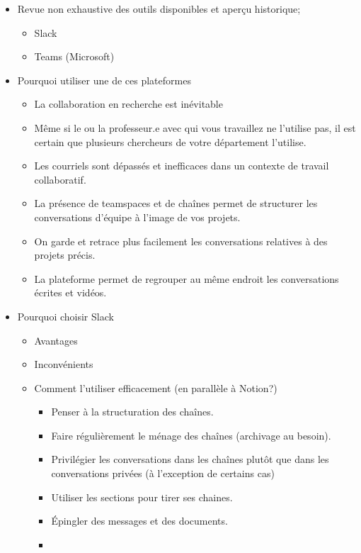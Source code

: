 \documentclass[
  letterpaper,
]{scrbook}
\providecommand{\tightlist}{%
  \setlength{\itemsep}{0pt}\setlength{\parskip}{0pt}}\usepackage{longtable,booktabs,array}
\begin{document}
\begin{itemize}
\tightlist
\item
  Revue non exhaustive des outils disponibles et aperçu historique;

  \begin{itemize}
  \item
    Slack
  \item
    Teams (Microsoft)
  \end{itemize}
\item
  Pourquoi utiliser une de ces plateformes

  \begin{itemize}
  \item
    La collaboration en recherche est inévitable
  \item
    Même si le ou la professeur.e avec qui vous travaillez ne l'utilise
    pas, il est certain que plusieurs chercheurs de votre département
    l'utilise.
  \item
    Les courriels sont dépassés et inefficaces dans un contexte de
    travail collaboratif.
  \item
    La présence de teamspaces et de chaînes permet de structurer les
    conversations d'équipe à l'image de vos projets.
  \item
    On garde et retrace plus facilement les conversations relatives à
    des projets précis.
  \item
    La plateforme permet de regrouper au même endroit les conversations
    écrites et vidéos.
  \end{itemize}
\item
  Pourquoi choisir Slack

  \begin{itemize}
  \tightlist
  \item
    Avantages
  \item
    Inconvénients
  \item
    Comment l'utiliser efficacement (en parallèle à Notion?)

    \begin{itemize}
    \item
      Penser à la structuration des chaînes.
    \item
      Faire régulièrement le ménage des chaînes (archivage au besoin).
    \item
      Privilégier les conversations dans les chaînes plutôt que dans les
      conversations privées (à l'exception de certains cas)
    \item
      Utiliser les sections pour tirer ses chaines.
    \item
      Épingler des messages et des documents.
    \item
    \end{itemize}
  \end{itemize}
\end{itemize}
\end{document}
